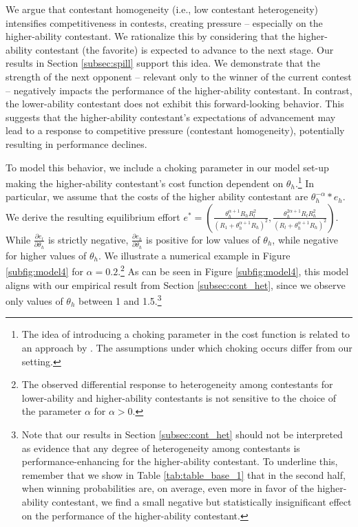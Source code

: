 \documentclass[11pt,a4paper]{article}
\begin{document}
We argue that contestant homogeneity (i.e., low contestant heterogeneity) intensifies competitiveness in contests, creating pressure -- especially on the higher-ability contestant. We rationalize this by considering that the higher-ability contestant (the favorite) is expected to advance to the next stage. Our results in Section \ref{subsec:spill} support this idea. We demonstrate that the strength of the next opponent -- relevant only to the winner of the current contest -- negatively impacts the performance of the higher-ability contestant. In contrast, the lower-ability contestant does not exhibit this forward-looking behavior.
This suggests that the higher-ability contestant's expectations of advancement may lead to a response to competitive pressure (contestant homogeneity), potentially resulting in performance declines.\par

To model this behavior, we include a choking parameter in our model set-up making the higher-ability contestant's cost function dependent on $\theta_h$.\footnote{The idea of introducing a choking parameter in the cost function is related to an approach by . The assumptions under which choking occurs differ from our setting.} In particular, we assume that the costs of the higher ability contestant are $\theta_h^{-\alpha} * e_h$. We derive the resulting equilibrium effort $e^*=(\frac{\theta_h^{\alpha + 1} R_hR_l^2}{(R_1 + \theta_h^{\alpha + 1}R_h)^2}, \frac{\theta_h^{2\alpha + 1} R_lR_h^2}{(R_l + \theta_h^{\alpha + 1}R_h)^2})$. While $\frac{\partial e_l}{\partial \theta_h}$ is strictly negative, $\frac{\partial e_h}{\partial \theta_h}$ is positive for low values of $\theta_h$, while negative for higher values of $\theta_h$. We illustrate a numerical example in Figure \ref{subfig:model4} for $\alpha = 0.2$.\footnote{The observed differential response to heterogeneity among contestants for lower-ability and higher-ability contestants is not sensitive to the choice of the parameter $\alpha$ for $\alpha > 0$.} As can be seen in Figure \ref{subfig:model4}, this model aligns with our empirical result from Section \ref{subsec:cont_het}, since we observe only values of $\theta_h$ between 1 and 1.5.\footnote{Note that our results in Section \ref{subsec:cont_het} should not be interpreted as evidence that any degree of heterogeneity among contestants is performance-enhancing for the higher-ability contestant. To underline this, remember that we show in Table \ref{tab:table_base_1} that in the second half, when winning probabilities are, on average, even more in favor of the higher-ability contestant, we find a small negative but statistically insignificant effect on the performance of the higher-ability contestant.} \par
\end{document}
